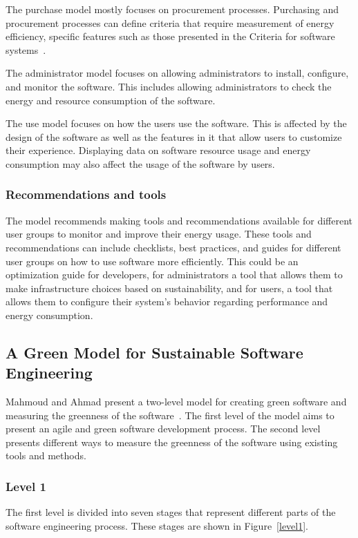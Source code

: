 The purchase model mostly focuses on procurement processes. Purchasing and procurement processes can define criteria that require measurement of energy efficiency, specific features such as those presented in the Criteria for software systems~\cite{kriteeripankkiSoftwareServices}.

The administrator model focuses on allowing administrators to install, configure, and monitor the software. This includes allowing administrators to check the energy and resource consumption of the software.

The use model focuses on how the users use the software. This is affected by the design of the software as well as the features in it that allow users to customize their experience. Displaying data on software resource usage and energy consumption may also affect the usage of the software by users.

\subsubsection{Recommendations and tools}
The model recommends making tools and recommendations available for different user groups to monitor and improve their energy usage. These tools and recommendations can include checklists, best practices, and guides for different user groups on how to use software more efficiently. This could be an optimization guide for developers, for administrators a tool that allows them to make infrastructure choices based on sustainability, and for users, a tool that allows them to configure their system's behavior regarding performance and energy consumption.~\cite{greensoft}

\subsection{A Green Model for Sustainable Software Engineering}\label{greenmodelforsustainable}
Mahmoud and Ahmad present a two-level model for creating green software and measuring the greenness of the software~\cite{greenmodelforsustainable}. The first level of the model aims to present an agile and green software development process. The second level presents different ways to measure the greenness of the software using existing tools and methods.

\subsubsection{Level 1}
The first level is divided into seven stages that represent different parts of the software engineering process. These stages are shown in Figure~\ref{level1}. 

